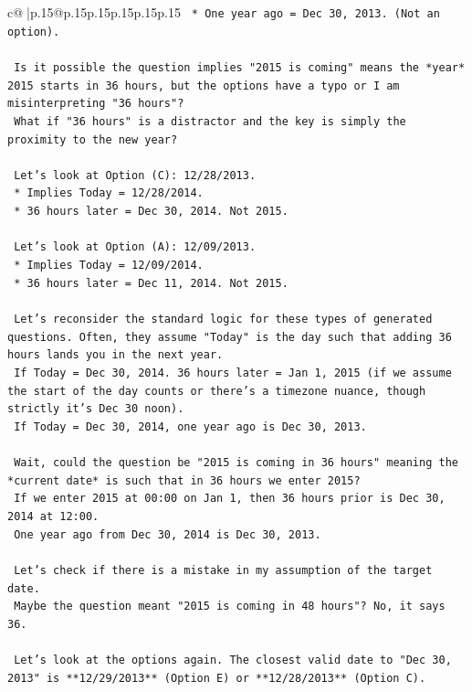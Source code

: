 \documentclass{article}
\begin{document}
{\begin{supertabular}{c@{$\;$}|p{.15\linewidth}@{}p{.15\linewidth}p{.15\linewidth}p{.15\linewidth}p{.15\linewidth}p{.15\linewidth}}
{{{\texttt{    *   One year ago = Dec 30, 2013. (Not an option).} \\
\\ 
\texttt{    Is it possible the question implies "2015 is coming" means the *year* 2015 starts in 36 hours, but the options have a typo or I am misinterpreting "36 hours"?} \\
\texttt{    What if "36 hours" is a distractor and the key is simply the proximity to the new year?} \\
\\ 
\texttt{    Let's look at Option (C): 12/28/2013.} \\
\texttt{    *   Implies Today = 12/28/2014.} \\
\texttt{    *   36 hours later = Dec 30, 2014. Not 2015.} \\
\\ 
\texttt{    Let's look at Option (A): 12/09/2013.} \\
\texttt{    *   Implies Today = 12/09/2014.} \\
\texttt{    *   36 hours later = Dec 11, 2014. Not 2015.} \\
\\ 
\texttt{    Let's reconsider the standard logic for these types of generated questions. Often, they assume "Today" is the day such that adding 36 hours lands you in the next year.} \\
\texttt{    If Today = Dec 30, 2014. 36 hours later = Jan 1, 2015 (if we assume the start of the day counts or there's a timezone nuance, though strictly it's Dec 30 noon).} \\
\texttt{    If Today = Dec 30, 2014, one year ago is Dec 30, 2013.} \\
\\ 
\texttt{    Wait, could the question be "2015 is coming in 36 hours" meaning the *current date* is such that in 36 hours we enter 2015?} \\
\texttt{    If we enter 2015 at 00:00 on Jan 1, then 36 hours prior is Dec 30, 2014 at 12:00.} \\
\texttt{    One year ago from Dec 30, 2014 is Dec 30, 2013.} \\
\\ 
\texttt{    Let's check if there is a mistake in my assumption of the target date.} \\
\texttt{    Maybe the question meant "2015 is coming in 48 hours"? No, it says 36.} \\
\\ 
\texttt{    Let's look at the options again. The closest valid date to "Dec 30, 2013" is **12/29/2013** (Option E) or **12/28/2013** (Option C).} \\
}}}
\end{supertabular}}
\end{document}
